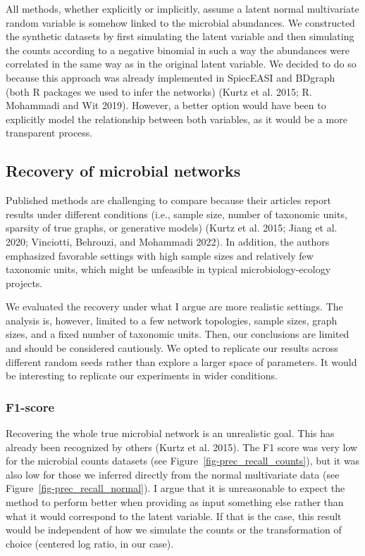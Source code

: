 \documentclass[
  a4paper,
]{article}
\begin{document}
All methods, whether explicitly or implicitly, assume a latent normal
multivariate random variable is somehow linked to the microbial
abundances. We constructed the synthetic datasets by first simulating
the latent variable and then simulating the counts according to a
negative binomial in such a way the abundances were correlated in the
same way as in the original latent variable. We decided to do so because
this approach was already implemented in SpiecEASI and BDgraph (both R
packages we used to infer the networks) (Kurtz et al. 2015; R. Mohammadi
and Wit 2019). However, a better option would have been to explicitly
model the relationship between both variables, as it would be a more
transparent process.

\hypertarget{recovery-of-microbial-networks-2}{%
\subsection{Recovery of microbial
networks}\label{recovery-of-microbial-networks-2}}

Published methods are challenging to compare because their articles
report results under different conditions (i.e., sample size, number of
taxonomic units, sparsity of true graphs, or generative models) (Kurtz
et al. 2015; Jiang et al. 2020; Vinciotti, Behrouzi, and Mohammadi
2022). In addition, the authors emphasized favorable settings with high
sample sizes and relatively few taxonomic units, which might be
unfeasible in typical microbiology-ecology projects.

We evaluated the recovery under what I argue are more realistic
settings. The analysis is, however, limited to a few network topologies,
sample sizes, graph sizes, and a fixed number of taxonomic units. Then,
our conclusions are limited and should be considered cautiously. We
opted to replicate our results across different random seeds rather than
explore a larger space of parameters. It would be interesting to
replicate our experiments in wider conditions.

\hypertarget{f1-score-1}{%
\subsubsection{F1-score}\label{f1-score-1}}

Recovering the whole true microbial network is an unrealistic goal. This
has already been recognized by others (Kurtz et al. 2015). The F1 score
was very low for the microbial counts datasets (see
Figure~\ref{fig-prec_recall_counts}), but it was also low for those we
inferred directly from the normal multivariate data (see
Figure~\ref{fig-prec_recall_normal}). I argue that it is unreasonable to
expect the method to perform better when providing as input something
else rather than what it would correspond to the latent variable. If
that is the case, this result would be independent of how we simulate
the counts or the transformation of choice (centered log ratio, in our
case).
\end{document}

